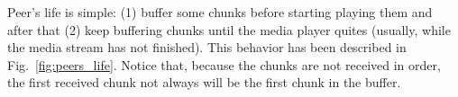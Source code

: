 \label{sec:peers_life}

\begin{figure*}
   \caption{Main actions carried out by peer
    $P_k$.\label{fig:peers_life}}
\end{figure*}

Peer's life is simple: (1) buffer some chunks before starting playing
them and after that (2) keep buffering chunks until the media player
quites (usually, while the media stream has not finished). This
behavior has been described in Fig.~\ref{fig:peers_life}. Notice that,
because the chunks are not received in order, the first received chunk
not always will be the first chunk in the buffer.
